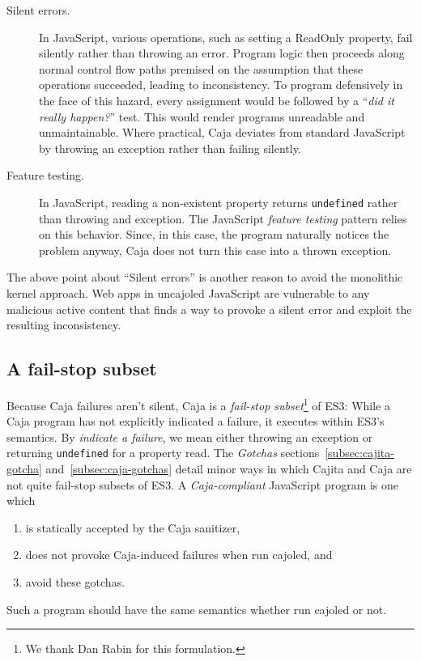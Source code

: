 \documentclass[letterpaper,twocolumn,10pt]{article}
\newcommand{\code}[1]{{\tt {#1}}}              %
\begin{document}
\begin{description}
  \item[Silent errors.] In JavaScript, various operations, such as setting a ReadOnly property, fail silently rather 
  than throwing an error. Program logic then proceeds along normal control flow paths premised on the assumption that 
  these operations succeeded, leading to inconsistency. To program defensively in the face of this hazard, every 
  assignment would be followed by a ``\emph{did it really happen?}'' test. This would render programs unreadable and 
  unmaintainable. Where practical, Caja deviates from standard JavaScript by throwing an exception rather than 
  failing silently.
  
  \item[Feature testing.] In JavaScript, reading a non-existent property returns \code{undefined} rather than 
  throwing and exception. The JavaScript \emph{feature testing} pattern relies on this behavior. Since, in this case, 
  the program naturally notices the problem anyway, Caja does not turn this case into a thrown exception.
    
\end{description}

The above point about ``Silent errors'' is another reason to avoid the monolithic kernel approach. Web apps in 
uncajoled JavaScript are vulnerable to any malicious active content that finds a way to provoke a silent error and 
exploit the resulting inconsistency.

\subsection{A fail-stop subset}
\label{subsec:fail-stop}

Because Caja failures aren't silent, Caja is a \emph{fail-stop subset}\footnote{
%
We thank Dan Rabin for this formulation.
%
} of ES3: While a Caja program has not explicitly indicated a failure, it executes within ES3's semantics. By 
\emph{indicate a failure}, we mean either throwing an exception or returning \code{undefined} for a property read. 
The \emph{Gotchas} sections~\ref{subsec:cajita-gotcha} and~\ref{subsec:caja-gotchas} detail minor ways in which 
Cajita and Caja are not quite fail-stop subsets of ES3. A \emph{Caja-compliant} JavaScript program is one which
\begin{enumerate}
  \item is statically accepted by the Caja sanitizer,
  \item does not provoke Caja-induced failures when run cajoled, and
  \item avoid these gotchas.
\end{enumerate}
Such a program should have the same semantics whether run cajoled or not.
\end{document}
